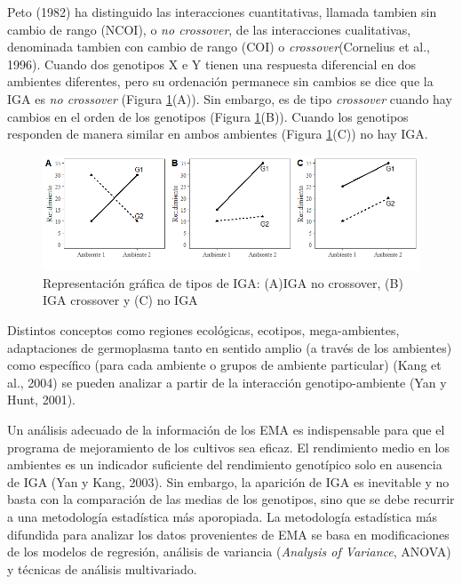 Peto (1982) ha distinguido las interacciones cuantitativas, llamada tambien sin cambio de rango (NCOI), o \emph{no crossover}, de las interacciones cualitativas, denominada tambien con
cambio de rango (COI) o \emph{crossover}(Cornelius et al., 1996). Cuando dos genotipos X e Y tienen una respuesta diferencial en dos ambientes diferentes, pero su ordenación permanece sin cambios se dice que la IGA es \emph{no crossover} (Figura \ref{fig:fig11}(A)). Sin embargo, es de tipo \emph{crossover} cuando hay cambios en el orden de los genotipos (Figura  \ref{fig:fig11}(B)). Cuando los genotipos responden de manera similar en ambos ambientes (Figura \ref{fig:fig11}(C)) no hay IGA. 


\begin{figure}[h]
\begin{center}
\includegraphics[width=14cm]{./Graficos/interac}
\end{center}
\caption{Representación gráfica de tipos de IGA: (A)IGA no crossover, (B) IGA crossover y (C) no IGA}
\label{fig:fig11}
\end{figure}


Distintos conceptos como regiones ecológicas, ecotipos, mega-ambientes, adaptaciones de germoplasma tanto en sentido amplio (a través de los ambientes) como específico (para cada ambiente o grupos de ambiente particular) (Kang et al., 2004) se pueden analizar a partir de la interacción genotipo-ambiente (Yan y Hunt, 2001).


Un análisis adecuado de la información de los EMA es indispensable para que el programa de mejoramiento de los cultivos sea eficaz. El rendimiento medio en los ambientes es un indicador suficiente del rendimiento genotípico solo en ausencia de IGA (Yan y Kang, 2003). Sin embargo, la aparición de IGA es inevitable y no basta con la comparación de las medias de los genotipos, sino que se debe recurrir a una metodología estadística más aporopiada. La metodología estadística más difundida para analizar los datos provenientes de EMA se basa en modificaciones de los modelos de regresión, análisis de variancia (\emph{Analysis of Variance}, ANOVA) y técnicas de análisis multivariado. 


